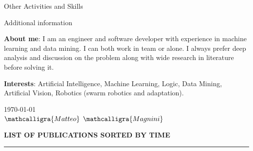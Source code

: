 \documentclass{resume} %
\begin{document}
\begin{rSection}{Other Activities and Skills}

        \begin{rSubsection}{Additional information}{}{}{}
            \item \textbf{About me}: I am an engineer and software developer with experience in machine learning and data mining. I can both work in team or alone. I always prefer deep analysis and discussion on the problem along with wide research in literature before solving it.
            \item \textbf{Interests}: Artificial Intelligence, Machine Learning, Logic, Data Mining, Artificial Vision, Robotics (swarm robotics and adaptation).
        \end{rSubsection}

    \end{rSection}
    
    \vspace{2em} %
    \begin{flushright}
        \today
        \\
        \vspace{1em}
        \Large$\mathcalligra{Matteo}$  $\mathcalligra{Magnini}$
        
    \end{flushright}

    \pagebreak
    \MakeUppercase{\bf List of Publications Sorted by Time} %
    \sectionlineskip
    \hrule %
    \vspace{-1cm}
    \nocite{*}
    
    \renewcommand\refname{}
    
    
\end{document}
